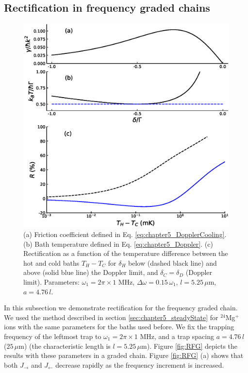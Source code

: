 \subsection{Rectification in frequency graded chains \label{GradedChains}}
%
%
\begin{figure}
  \center
  \includegraphics[width=0.75\linewidth]{Figures/R_as_function_of_TemperatureBias.eps}
  \caption{ (a) Friction coefficient defined in Eq. \eqref{eq:chapter5_DopplerCooling}. (b) Bath temperature defined in Eq. \eqref{eq:chapter5_Doppler}. (c) Rectification as a function of the temperature difference between the hot and cold baths $T_H -T_C$ for $\delta_H$ below (dashed black line) and above (solid blue line) the Doppler limit, and $\delta_C=\delta_D$ (Doppler limit). Parameters: $\omega_1 = 2 \pi \times 1$ MHz, $\Delta \omega = 0.15 \, \omega_1$, $l = 5.25\,\mu$m, $a = 4.76 \, l$.}
  \label{fig:RD}
\end{figure}
%
In this subsection we demonstrate rectification for the frequency graded chain. We  used the method described in section \ref{sec:chapter5_steadyState} for $^{24}$Mg$^+$ ions with the same parameters for the baths used before. We fix the trapping frequency of the leftmost trap to $\omega_1 = 2\pi \times 1$ MHz, and a trap spacing $a = 4.76\, l$ ($25\,\mu$m) (the  characteristic length is $l = 5.25\,\mu$m). Figure \ref{fig:RFG} depicts  the results with these parameters in a graded chain. Figure \ref{fig:RFG} (a) shows that both
$J_\rightarrow$ and $J_\leftarrow$
decrease rapidly as the frequency increment  is increased.
